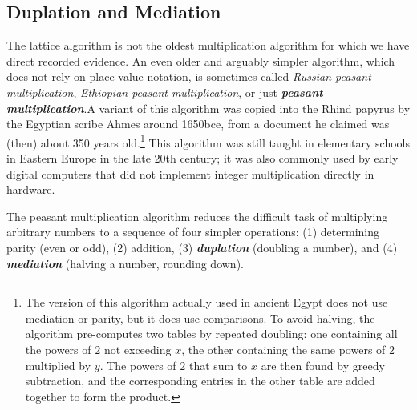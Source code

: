 \subsection{Duplation and Mediation}
The lattice algorithm is not the oldest multiplication algorithm for which we have direct recorded evidence. An even older and arguably simpler algorithm, which does not rely on place-value notation, is sometimes called \textit{Russian peasant multiplication}, \textit{Ethiopian peasant multiplication}, or just \textbf{\textit{peasant multiplication}}.A variant of this algorithm was copied into the Rhind papyrus by the Egyptian scribe Ahmes around 1650bce, from a document he claimed was (then) about 350 years old.\footnote{The version of this algorithm actually used in ancient Egypt does not use mediation or parity, but it does use comparisons. To avoid halving, the algorithm pre-computes two tables by repeated doubling: one containing all the powers of $2$ not exceeding $x$, the other containing the same powers of $2$ multiplied by $y$. The powers of $2$ that sum to $x$ are then found by greedy subtraction, and the corresponding entries in the other table are added together to form the product.} This algorithm was still taught in elementary schools in Eastern Europe in the late 20th century; it was also commonly used by early digital computers that did not implement integer multiplication directly in hardware.

The peasant multiplication algorithm reduces the difficult task of multiplying arbitrary numbers to a sequence of four simpler operations: (1) determining parity (even or odd), (2) addition, (3) \textbf{\textit{duplation}} (doubling a number), and (4) \textbf{\textit{mediation}} (halving a number, rounding down).


